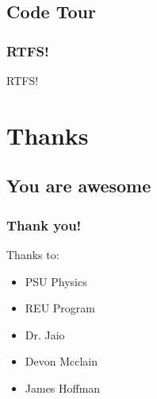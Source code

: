 \documentclass{beamer}
\begin{document}
\subsection{Code Tour}
\frame
{
    \frametitle{RTFS!}
    \begin{center}
    RTFS!
    \end{center}
}

\section{Thanks}
\subsection{You are awesome}
\frame
{
    \frametitle{Thank you!}
    Thanks to:

    \begin{itemize}
        \item PSU Physics
        \item REU Program
        \item Dr. Jaio
        \item Devon Mcclain
        \item James Hoffman
    \end{itemize}
    
}
\end{document}
